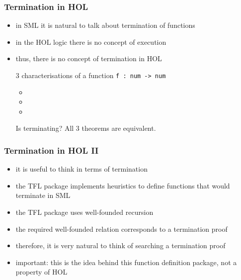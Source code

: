 \begin{frame}[fragile]
\frametitle{Termination in HOL}
\begin{itemize}
\item in SML it is natural to talk about termination of functions
\item in the HOL logic there is no concept of execution
\item thus, there is no concept of termination in HOL
\begin{minipage}{.8\textwidth}
\begin{exampleblock}{3 characterisations of a function \texttt{f :\ num -> num}}
\begin{itemize}
\item {}
\item {}
\item {}
\end{itemize}
Is  terminating? All 3 theorems are equivalent.
\end{exampleblock}
\end{minipage}\bigskip
\end{itemize}
\end{frame}

\begin{frame}[fragile]
\frametitle{Termination in HOL II}
\begin{itemize}
\item it is useful to think in terms of termination
\item the TFL package implements heuristics to define functions that would terminate in SML
\item the TFL package uses well-founded recursion
\item the required well-founded relation corresponds to a termination proof
\item therefore, it is very natural to think of  searching a termination proof
\item important: this is the idea behind this function definition package, not a property of HOL
\end{itemize}
\end{frame}

